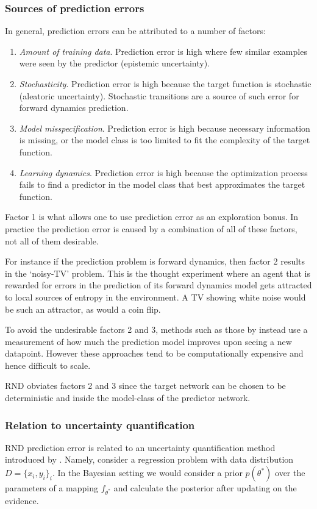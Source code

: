 \documentclass{article} %
\begin{document}
\subsubsection{Sources of prediction errors}
\label{sec:prediction_error}In general, prediction errors can be attributed to a number of factors:
\begin{enumerate}
    \item \emph{Amount of training data}. Prediction error is high where few similar examples were seen by the predictor (epistemic uncertainty).
    \item \emph{Stochasticity}. Prediction error is high because the target function is stochastic (aleatoric uncertainty). Stochastic transitions are a source of such error for forward dynamics prediction.
    \item \emph{Model misspecification}. Prediction error is high because necessary information is missing, or the model class is too limited to fit the complexity of the target function.
    \item \emph{Learning dynamics}. Prediction error is high because the optimization process fails to find a predictor in the model class that best approximates the target function.
\end{enumerate}

Factor 1 is what allows one to use prediction error as an exploration bonus. In practice the prediction error is caused by a combination of all of these factors, not all of them desirable.

For instance if the prediction problem is forward dynamics, then factor 2 results in the `noisy-TV' problem. This is the thought experiment where an agent that is rewarded for errors in the prediction of its forward dynamics model gets attracted to local sources of entropy in the environment. A TV showing white noise would be such an attractor, as would a coin flip.

To avoid the undesirable factors 2 and 3, methods such as those by \cite{schmidhuber1991curious,oudeyer2007intrinsic,lopes2012exploration,josh_surprise} instead use a measurement of how much the prediction model improves upon seeing a new datapoint. However these approaches tend to be computationally expensive and hence difficult to scale.

RND obviates factors 2 and 3 since the target network can be chosen to be deterministic and inside the model-class of the predictor network.

\subsubsection{Relation to uncertainty quantification}
RND prediction error is related to an uncertainty quantification method introduced by \cite{osband2018randomized}. Namely, consider a regression problem with data distribution $D = \{x_i, y_i \}_i$. In the Bayesian setting we would consider a prior $p(\theta^*)$ over the parameters of a mapping $f_{\theta^*}$ and calculate the posterior after updating on the evidence. 
\end{document}
